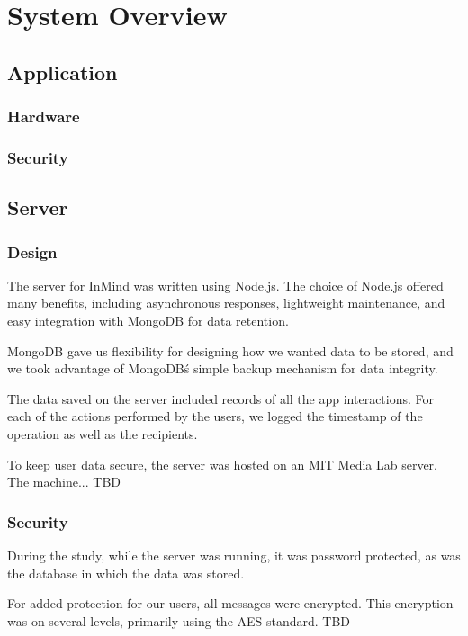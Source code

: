 \chapter{System Overview}

  \section{Application}
    \subsection{Hardware}

    \subsection{Security}


  \section{Server}
    \subsection{Design}
      The server for InMind was written using Node.js.
      The choice of Node.js offered many benefits, including asynchronous responses,
      lightweight maintenance, and easy integration with MongoDB for data retention.

      MongoDB gave us flexibility for designing how we wanted data to be stored,
      and we took advantage of MongoDB\'s simple backup mechanism for data integrity.

      The data saved on the server included records of all the app interactions.
      For each of the actions performed by the users,
      we logged the timestamp of the operation as well as the recipients.

      To keep user data secure, the server was hosted on an MIT Media Lab server.
      The machine... TBD

    \subsection{Security}
      During the study, while the server was running, it was password protected,
      as was the database in which the data was stored.

      For added protection for our users, all messages were encrypted.
      This encryption was on several levels, primarily using the AES standard.
      TBD


